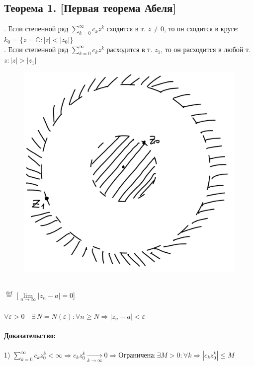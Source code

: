 \documentclass[a4paper,12pt]{article} %
\begin{document}
	\subsection*{Теорема 1. [Первая теорема Абеля]}
	. Если степенной ряд $\sum\limits_{k = 0}^\infty c_k z^k$ сходится в т. $z \neq 0$, то он сходится в круге: $k_0 = \{z = \mathbb{C}: |z| < |z_0|\}$ \\
	. Если степенной ряд $\sum\limits_{k = 0}^\infty c_k z^k$ расходится в т. $z_1$, то он расходится в любой т. $z: |z| > |z_1|$ \\
	\begin{figure}[h!]
		\centering
	\includegraphics[scale = 0.1]{Que_11_pic_1.jpeg}
	\end{figure}
\ \\
\noindent[$\lim\limits_{n \rightarrow \infty} z_n = a$] $ \stackrel{\text{def}}{=}$ [$\lim\limits_{n \rightarrow \infty} |z_n - a| = 0$] \\
\ \\
$\forall \varepsilon > 0 \quad\exists \, N = N (\varepsilon): \forall n \geqslant N \Rightarrow |z_n - a| < \varepsilon $ \\
\ \\
\noindent\textbf{Доказательство:} \\
\ \\
1) $\sum\limits_{k = 0}^\infty c_k z_0^k < \infty \Rightarrow c_k z_0^k \underset{k \to \infty}{\longrightarrow} 0 \Rightarrow \text{Ограничена:} \,  \exists M > 0: \forall k \Rightarrow |c_k z_0^k| \leqslant M$ \\
\end{document}
